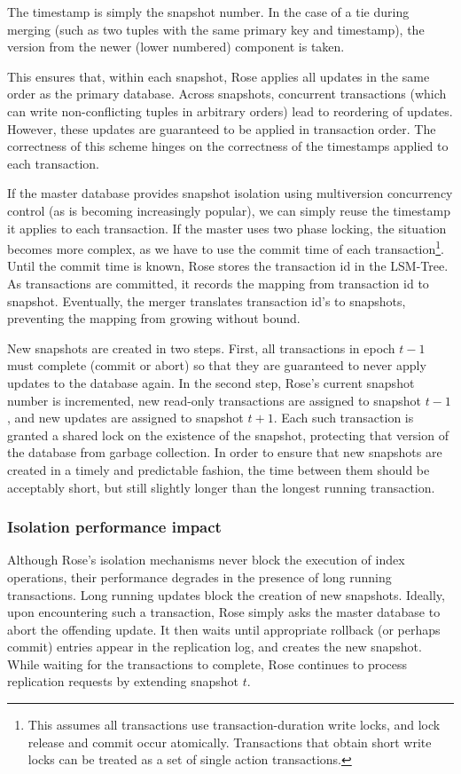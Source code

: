 \documentclass{vldb}
\newcommand{\rows}{Rose\xspace}
\newcommand{\rowss}{Rose's\xspace}
\begin{document}
The timestamp is simply the snapshot number.  In the case of a tie
during merging (such as two tuples with the same primary key and
timestamp), the version from the newer (lower numbered) component is
taken.

This ensures that, within each snapshot, \rows applies all updates in the
same order as the primary database.  Across snapshots, concurrent
transactions (which can write non-conflicting tuples in arbitrary
orders) lead to reordering of updates.  However, these updates are
guaranteed to be applied in transaction order.  The correctness of
this scheme hinges on the correctness of the timestamps applied to
each transaction.

If the master database provides snapshot isolation using multiversion
concurrency control (as is becoming increasingly popular), we can
simply reuse the timestamp it applies to each transaction.  If the
master uses two phase locking, the situation becomes more complex, as
we have to use the commit time of each transaction\footnote{This assumes
  all transactions use transaction-duration write locks, and lock
  release and commit occur atomically.  Transactions that obtain short
  write locks can be treated as a set of single action transactions.}.
Until the commit time is known, \rows stores the transaction id in the
LSM-Tree.  As transactions are committed, it records the mapping from
transaction id to snapshot.  Eventually, the merger translates
transaction id's to snapshots, preventing the mapping from growing
without bound.

New snapshots are created in two steps.  First, all transactions in
epoch $t-1$ must complete (commit or abort) so that they are
guaranteed to never apply updates to the database again.  In the
second step, \rowss current snapshot number is incremented, new
read-only transactions are assigned to snapshot $t-1$, and new updates
are assigned to snapshot $t+1$.  Each such transaction is granted a
shared lock on the existence of the snapshot, protecting that version
of the database from garbage collection.  In order to ensure that new
snapshots are created in a timely and predictable fashion, the time
between them should be acceptably short, but still slightly longer
than the longest running transaction.

\subsubsection{Isolation performance impact}

Although \rowss isolation mechanisms never block the execution of
index operations, their performance degrades in the presence of long
running transactions. Long running updates block the creation of new
snapshots.  Ideally, upon encountering such a transaction, \rows
simply asks the master database to abort the offending update.  It
then waits until appropriate rollback (or perhaps commit) entries
appear in the replication log, and creates the new snapshot.  While
waiting for the transactions to complete, \rows continues to process
replication requests by extending snapshot $t$.
\end{document}
